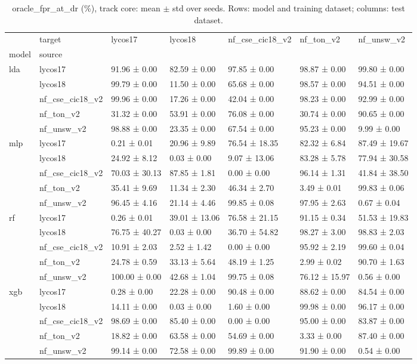 \begin{table}
\caption{oracle_fpr_at_dr (\%), track core: mean $\pm$ std over seeds. Rows: model and training dataset; columns: test dataset.}
\label{tab:matrix_core_oracle_fpr_at_dr}
\begin{tabular}{lllllll}
\toprule
 & target & lycos17 & lycos18 & nf_cse_cic18_v2 & nf_ton_v2 & nf_unsw_v2 \\
model & source &  &  &  &  &  \\
\midrule
\multirow[t]{5}{*}{lda} & lycos17 & 91.96 ± 0.00 & 82.59 ± 0.00 & 97.85 ± 0.00 & 98.87 ± 0.00 & 99.80 ± 0.00 \\
 & lycos18 & 99.79 ± 0.00 & 11.50 ± 0.00 & 65.68 ± 0.00 & 98.57 ± 0.00 & 94.51 ± 0.00 \\
 & nf_cse_cic18_v2 & 99.96 ± 0.00 & 17.26 ± 0.00 & 42.04 ± 0.00 & 98.23 ± 0.00 & 92.99 ± 0.00 \\
 & nf_ton_v2 & 31.32 ± 0.00 & 53.91 ± 0.00 & 76.08 ± 0.00 & 30.74 ± 0.00 & 90.65 ± 0.00 \\
 & nf_unsw_v2 & 98.88 ± 0.00 & 23.35 ± 0.00 & 67.54 ± 0.00 & 95.23 ± 0.00 & 9.99 ± 0.00 \\
\cline{1-7}
\multirow[t]{5}{*}{mlp} & lycos17 & 0.21 ± 0.01 & 20.96 ± 9.89 & 76.54 ± 18.35 & 82.32 ± 6.84 & 87.49 ± 19.67 \\
 & lycos18 & 24.92 ± 8.12 & 0.03 ± 0.00 & 9.07 ± 13.06 & 83.28 ± 5.78 & 77.94 ± 30.58 \\
 & nf_cse_cic18_v2 & 70.03 ± 30.13 & 87.85 ± 1.81 & 0.00 ± 0.00 & 96.14 ± 1.31 & 41.84 ± 38.50 \\
 & nf_ton_v2 & 35.41 ± 9.69 & 11.34 ± 2.30 & 46.34 ± 2.70 & 3.49 ± 0.01 & 99.83 ± 0.06 \\
 & nf_unsw_v2 & 96.45 ± 4.16 & 21.14 ± 4.46 & 99.85 ± 0.08 & 97.95 ± 2.63 & 0.67 ± 0.04 \\
\cline{1-7}
\multirow[t]{5}{*}{rf} & lycos17 & 0.26 ± 0.01 & 39.01 ± 13.06 & 76.58 ± 21.15 & 91.15 ± 0.34 & 51.53 ± 19.83 \\
 & lycos18 & 76.75 ± 40.27 & 0.03 ± 0.00 & 36.70 ± 54.82 & 98.27 ± 3.00 & 98.83 ± 2.03 \\
 & nf_cse_cic18_v2 & 10.91 ± 2.03 & 2.52 ± 1.42 & 0.00 ± 0.00 & 95.92 ± 2.19 & 99.60 ± 0.04 \\
 & nf_ton_v2 & 24.78 ± 0.59 & 33.13 ± 5.64 & 48.19 ± 1.25 & 2.99 ± 0.02 & 90.70 ± 1.63 \\
 & nf_unsw_v2 & 100.00 ± 0.00 & 42.68 ± 1.04 & 99.75 ± 0.08 & 76.12 ± 15.97 & 0.56 ± 0.00 \\
\cline{1-7}
\multirow[t]{5}{*}{xgb} & lycos17 & 0.28 ± 0.00 & 22.28 ± 0.00 & 90.48 ± 0.00 & 88.62 ± 0.00 & 84.54 ± 0.00 \\
 & lycos18 & 14.11 ± 0.00 & 0.03 ± 0.00 & 1.60 ± 0.00 & 99.98 ± 0.00 & 96.17 ± 0.00 \\
 & nf_cse_cic18_v2 & 98.69 ± 0.00 & 85.40 ± 0.00 & 0.00 ± 0.00 & 95.00 ± 0.00 & 83.87 ± 0.00 \\
 & nf_ton_v2 & 18.82 ± 0.00 & 63.58 ± 0.00 & 54.69 ± 0.00 & 3.33 ± 0.00 & 87.40 ± 0.00 \\
 & nf_unsw_v2 & 99.14 ± 0.00 & 72.58 ± 0.00 & 99.89 ± 0.00 & 91.90 ± 0.00 & 0.54 ± 0.00 \\
\cline{1-7}
\bottomrule
\end{tabular}
\end{table}
